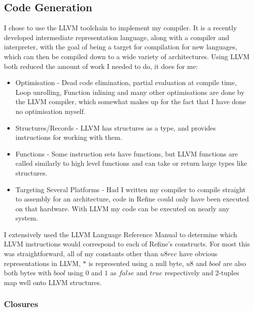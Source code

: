 \subsection{Code Generation}

I chose to use the LLVM toolchain to implement my compiler.
It is a recently developed intermediate representation language, along with a compiler and interpreter,
with the goal of being a target for compilation for new languages, which can then be compiled down to
a wide variety of architectures.
Using LLVM both reduced the amount of work I needed to do, it does for me:
\begin{itemize}
    \item Optimisation -
    Dead code elimination,
    partial evaluation at compile time,
    Loop unrolling,
    Function inlining
    and many other optimisations are done by the LLVM compiler, which somewhat makes up for the fact that
    I have done no optimisation myself.
    \item Structures/Records -
    LLVM has structures as a type, and provides instructions for working with them.
    \item Functions -
    Some instruction sets have functions, but LLVM functions are called similarly to high level functions
    and can take or return large types like structures.
    \item Targeting Several Platforms -
    Had I written my compiler to compile straight to assembly for an architecture, code in Refine could
    only have been executed on that hardware.
    With LLVM my code can be executed on nearly any system.
\end{itemize}
I extensively used the LLVM Language Reference Manual \cite{llvm} to determine which LLVM instructions
would correspond to each of Refine's constructs.
For most this was straightforward, all of my constants other than $u8rec$ have obvious representations
in LLVM, $\ast$ is represented using a null byte, $u8$ and $bool$ are also both bytes with $bool$ using
$0$ and $1$ as $false$ and $true$ respectively and 2-tuples map well onto LLVM structures.

\subsubsection{Closures}

